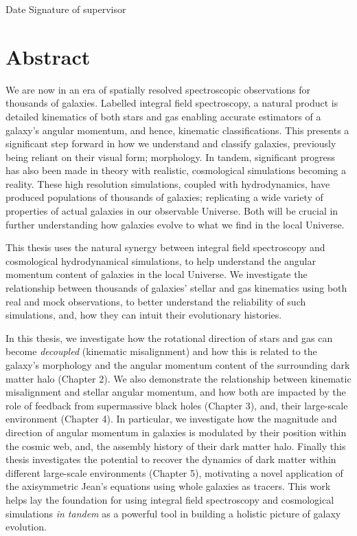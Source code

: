 \documentclass[11pt]{book}
\begin{document}
Date  \hspace{1.8in} Signature of supervisor \\


\chapter{Abstract}
We are now in an era of spatially resolved spectroscopic observations for thousands of galaxies. Labelled integral field spectroscopy, a natural product is detailed kinematics of both stars and gas enabling accurate estimators of a galaxy's angular momentum, and hence, kinematic classifications. This presents a significant step forward in how we understand and classify galaxies, previously being reliant on their visual form; morphology. In tandem, significant progress has also been made in theory with realistic, cosmological simulations becoming a reality. These high resolution simulations, coupled with hydrodynamics, have produced populations of thousands of galaxies; replicating a wide variety of properties of actual galaxies in our observable Universe. Both will be crucial in further understanding how galaxies evolve to what we find in the local Universe. 

This thesis uses the natural synergy between integral field spectroscopy and cosmological hydrodynamical simulations, to help understand the angular momentum content of galaxies in the local Universe. We investigate the relationship between thousands of galaxies' stellar and gas kinematics using both real and mock observations, to better understand the reliability of such simulations, and, how they can intuit their evolutionary histories.

In this thesis, we investigate how the rotational direction of stars and gas can become \textit{decoupled} (kinematic misalignment) and how this is related to the galaxy's morphology and the angular momentum content of the surrounding dark matter halo (Chapter 2). We also demonstrate the relationship between kinematic misalignment and stellar angular momentum, and how both are impacted by the role of feedback from supermassive black holes (Chapter 3), and, their large-scale environment (Chapter 4). In particular, we investigate how the magnitude and direction of angular momentum in galaxies is modulated by their position within the cosmic web, and, the assembly history of their dark matter halo. Finally this thesis investigates the potential to recover the dynamics of dark matter within different large-scale environments (Chapter 5), motivating a novel application of the axisymmetric Jean's equations using whole galaxies as tracers. This work helps lay the foundation for using integral field spectroscopy and cosmological simulations \textit{in tandem} as a powerful tool in building a holistic picture of galaxy evolution.
\end{document}
